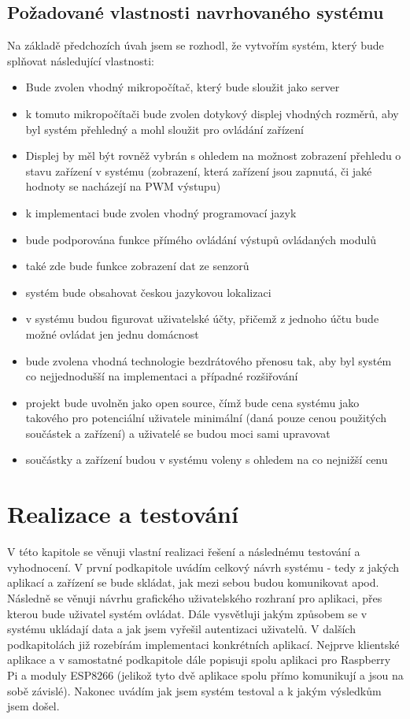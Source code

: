 \section{Požadované vlastnosti navrhovaného systému}
\label{navrh-reseni}
Na základě předchozích úvah jsem se rozhodl, že vytvořím systém, který bude splňovat následující vlastnosti:
\begin{itemize}
    \item Bude zvolen vhodný mikropočítač, který bude sloužit jako server
    \item k tomuto mikropočítači bude zvolen dotykový displej vhodných rozměrů, aby byl systém přehledný a mohl sloužit pro ovládání zařízení
    \item Displej by měl být rovněž vybrán s ohledem na možnost zobrazení přehledu o stavu zařízení v systému (zobrazení, která zařízení jsou zapnutá, či jaké hodnoty se nacházejí na PWM výstupu)
    \item k implementaci bude zvolen vhodný programovací jazyk
    \item bude podporována funkce přímého ovládání výstupů ovládaných modulů
    \item také zde bude funkce zobrazení dat ze senzorů
    \item systém bude obsahovat českou jazykovou lokalizaci
    \item v systému budou figurovat uživatelské účty, přičemž z jednoho účtu bude možné ovládat jen jednu domácnost
    \item bude zvolena vhodná technologie bezdrátového přenosu tak, aby byl systém co nejjednodušší na implementaci a případné rozšiřování
    \item projekt bude uvolněn jako open source, čímž bude cena systému jako takového pro potenciální uživatele minimální (daná pouze cenou použitých součástek a zařízení) a uživatelé se budou moci sami upravovat
    \item součástky a zařízení budou v systému voleny s ohledem na co nejnižší cenu
\end{itemize}

\chapter{Realizace a testování}
V této kapitole se věnuji vlastní realizaci řešení a následnému testování a vyhodnocení. V první podkapitole uvádím celkový návrh systému - tedy z jakých aplikací a zařízení se bude skládat, jak mezi sebou budou komunikovat apod. Následně se věnuji návrhu grafického uživatelského rozhraní pro aplikaci, přes kterou bude uživatel systém ovládat. Dále vysvětluji jakým způsobem se v systému ukládají data a jak jsem vyřešil autentizaci uživatelů. V dalších podkapitolách již rozebírám implementaci konkrétních aplikací. Nejprve klientské aplikace a v samostatné podkapitole dále popisuji spolu aplikaci pro Raspberry Pi a moduly ESP8266 (jelikož tyto dvě aplikace spolu přímo komunikují a jsou na sobě závislé). Nakonec uvádím jak jsem systém testoval a k jakým výsledkům jsem došel.

